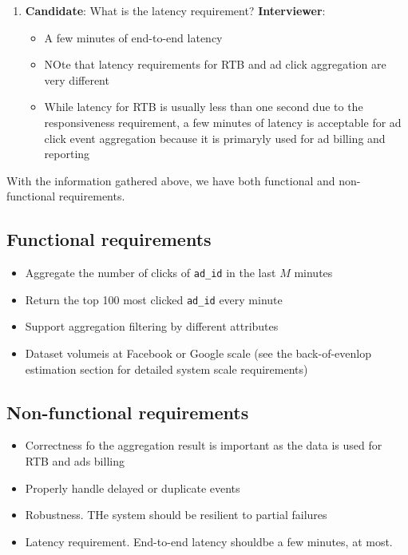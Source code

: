 \documentclass{report}
\theoremstyle{definition}
\let\oldsubsection\subsection
\renewcommand{\subsection}{\oldsubsection*}
\begin{document}
\begin{enumerate}
\textbf{Interviewer}: That's a good list. Yes, take these into consideration.

\item

\textbf{Candidate}: What is the latency requirement?
\textbf{Interviewer}:

\begin{itemize}
\item
A few minutes of end-to-end latency
\item
NOte that latency requirements for RTB and ad click aggregation are very different
\item
While latency for RTB is usually less  than one second due to the responsiveness requirement, a few minutes of latency is acceptable for ad click event aggregation because it is primaryly used for ad billing and reporting
\end{itemize}
\end{enumerate}

With the information gathered above, we have both functional and non-functional requirements.

\subsection{Functional requirements}

\begin{itemize}
\item
Aggregate the number of clicks of \lstinline|ad_id| in the last $M$ minutes
\item
Return the top 100 most clicked \lstinline|ad_id| every minute
\item
Support aggregation filtering by different attributes
\item
Dataset volumeis at Facebook or Google scale (see the back-of-evenlop estimation section for detailed system scale requirements)
\end{itemize}

\subsection{Non-functional requirements}

\begin{itemize}
\item
Correctness fo the aggregation result is important as the data is used for RTB and ads billing
\item
Properly handle delayed or duplicate events
\item
Robustness. THe system should be resilient to partial failures
\item
Latency requirement. End-to-end latency shouldbe a few minutes, at most.
\end{itemize}
\end{document}

